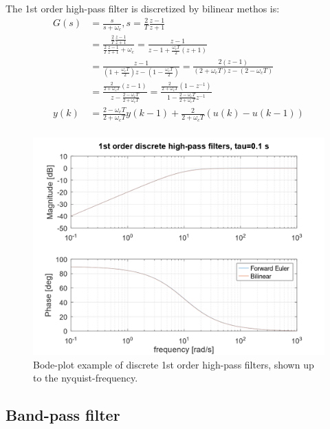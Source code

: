 \documentclass[]{book}
\begin{document}
The 1st order high-pass filter is discretized by bilinear methos is:
\[
\begin{aligned}
G(s) &=  \frac{s}{s + \omega_c}, s=\frac{2}{T} \frac{z-1}{z+1}  \\
&=  \frac{\frac{2}{T} \frac{z-1}{z+1}}{\frac{2}{T} \frac{z-1}{z+1} + \omega_c}
=\frac{z-1}{z-1 + \frac{\omega_c T}{2}(z+1) } \\
&=\frac{z-1}{(1+\frac{\omega_c T}{2}) z - (1-\frac{\omega_c T}{2}) }
= \frac{2(z-1)}{(2+\omega_c T) z - (2-\omega_c T) }   \\
&= \frac{ \frac{2}{2+\omega_c T} (z-1)}{ z - \frac{2-\omega_c T}{2+\omega_c T} }  
= \frac{ \frac{2}{2+\omega_c T} (1-z^{-1})}{ 1 - \frac{2-\omega_c T}{2+\omega_c T}z^{-1} }  \\
y(k) &=   \frac{2-\omega_c T}{2+\omega_c T}y(k-1)   + \frac{2}{2+\omega_c T}  (u(k)-u(k-1)) \\
\end{aligned}
\label{eq:dhpf2}
\]

\begin{figure}
\includegraphics[width=1\linewidth]{images/filters/hpf_1st_disc} \caption{Bode-plot example of discrete 1st order high-pass filters, shown up to the nyquist-frequency.}\label{fig:unnamed-chunk-9}
\end{figure}

\hypertarget{band-pass-filter-1}{%
\subsection{Band-pass filter}\label{band-pass-filter-1}}
\end{document}
